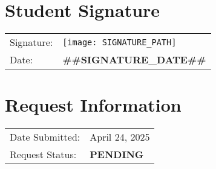 \documentclass[12pt]{article}
\begin{document}
\section*{Student Signature}
\begin{tabular}{ll}
Signature: & \texttt{[image: SIGNATURE\_PATH]} \\
Date: & \textbf{##SIGNATURE_DATE##} \\
\end{tabular}

\vspace{0.5cm}

\section*{Request Information}
\begin{tabular}{ll}
Date Submitted: & April 24, 2025 \\
Request Status: & \textbf{PENDING} \\
\end{tabular}



\label{LastPage}
\end{document}
